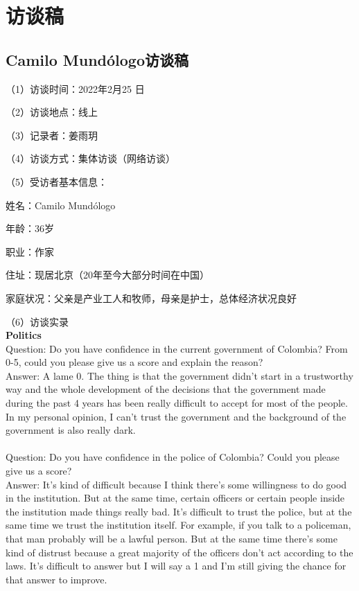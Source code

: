 \documentclass{phyasgn}\usepackage{nag}
\begin{document}
\section{访谈稿}
\subsection{Camilo Mundólogo访谈稿}
\par （1）访谈时间：2022年2月25 日
\par （2）访谈地点：线上
\par （3）记录者：姜雨玥
\par （4）访谈方式：集体访谈（网络访谈）
\par （5）受访者基本信息：
\par 姓名：Camilo Mundólogo
\par 年龄：36岁
\par 职业：作家
\par 住址：现居北京（20年至今大部分时间在中国）
\par 家庭状况：父亲是产业工人和牧师，母亲是护士，总体经济状况良好
\par （6）访谈实录\\
\textbf{Politics}\\
Question: Do you have confidence in the current government of Colombia? From 0-5, could you please give us a score and explain the reason?\\
Answer: A lame 0. The thing is that the government didn’t start in a trustworthy way and the whole development of the decisions that the government made during the past 4 years has been really difficult to accept for most of the people. In my personal opinion, I can’t trust the government and the background of the government is also really dark.\\
\\
Question: Do you have confidence in the police of Colombia? Could you please give us a score?\\
Answer: It’s kind of difficult because I think there’s some willingness to do good in the institution. But at the same time, certain officers or certain people inside the institution made things really bad. It’s difficult to trust the police, but at the same time we trust the institution itself. For example, if you talk to a policeman, that man probably will be a lawful person. But at the same time there’s some kind of distrust because a great majority of the officers don’t act according to the laws. It’s difficult to answer but I will say a 1 and I’m still giving the chance for that answer to improve.\\
\end{document}
